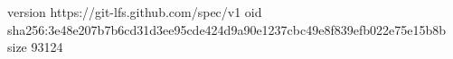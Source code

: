 version https://git-lfs.github.com/spec/v1
oid sha256:3e48e207b7b6cd31d3ee95cde424d9a90e1237cbc49e8f839efb022e75e15b8b
size 93124

